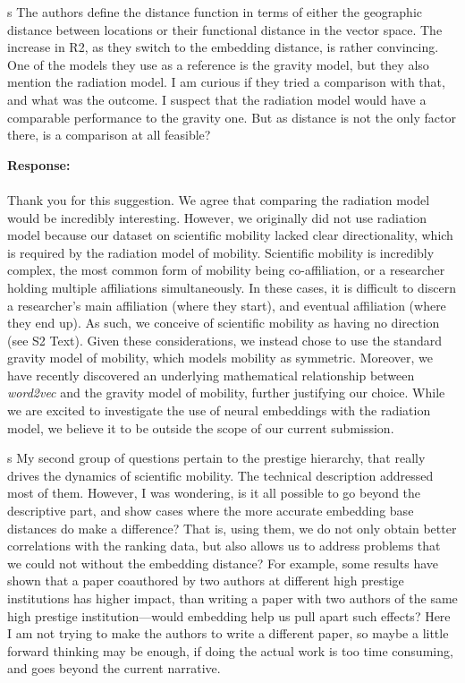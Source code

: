 \documentclass[12pt,a4paper]{article}
\newcommand{\response}[1]{{\noindent \textbf{Response:} \\ \\ \noindent #1}}
\newcommand{\rcomment}[1]{%
\vspace{10pt}
\begin{sectionbox}
s #1
\end{sectionbox}
}
\begin{document}
\rcomment{
	The authors define the distance function in terms of either the geographic distance between locations or their functional distance in the vector space. The increase in R2, as they switch to the embedding distance, is rather convincing. One of the models they use as a reference is the gravity model, but they also mention the radiation model. I am curious if they tried a comparison with that, and what was the outcome. I suspect that the radiation model would have a comparable performance to the gravity one. But as distance is not the only factor there, is a comparison at all feasible?
}

\response{Thank you for this suggestion.
	We agree that comparing the radiation model would be incredibly interesting.
	However, we originally did not use radiation model because our dataset on scientific mobility lacked clear directionality, which is required by the radiation model of mobility.
	Scientific mobility is incredibly complex, the most common form of mobility being co-affiliation, or a researcher holding multiple affiliations simultaneously.
	In these cases, it is difficult to discern a researcher's main affiliation (where they start), and eventual affiliation (where they end up).
	As such, we conceive of scientific mobility as having no direction (see S2 Text).
	Given these considerations, we instead chose to use the standard gravity model of mobility, which models mobility as symmetric.
	Moreover, we have recently discovered an underlying mathematical relationship between \textit{word2vec} and the gravity model of mobility, further justifying our choice.
	While we are excited to investigate the use of neural embeddings with the radiation model, we believe it to be outside the scope of our current submission.
}

\rcomment{
	My second group of questions pertain to the prestige hierarchy, that really drives the dynamics of scientific mobility. The technical description addressed most of them. However, I was wondering, is it all possible to go beyond the descriptive part, and show cases where the more accurate embedding base distances do make a difference? That is, using them, we do not only obtain better correlations with the ranking data, but also allows us to address problems that we could not without the embedding distance? For example, some results have shown that a paper coauthored by two authors at different high prestige institutions has higher impact, than writing a paper with two authors of the same high prestige institution—would embedding help us pull apart such effects? Here I am not trying to make the authors to write a different paper, so maybe a little forward thinking may be enough, if doing the actual work is too time consuming, and goes beyond the current narrative.
}
\end{document}
